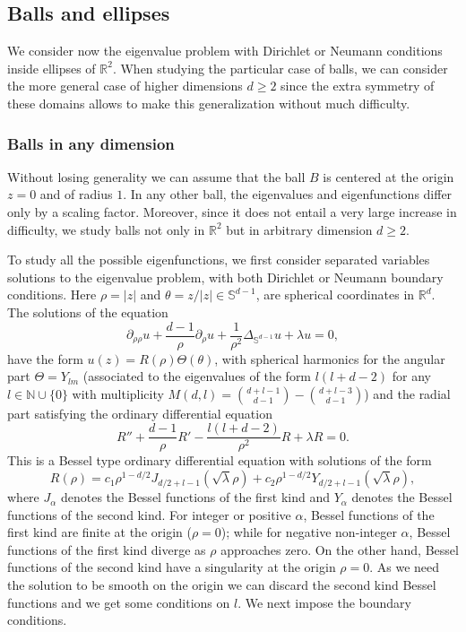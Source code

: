 \documentclass{amsart}
\theoremstyle{definition}
\theoremstyle{remark}
\def\RR{\mathbb{R}}
\renewcommand\geq\geqslant
\numberwithin{equation}{section}
\theoremstyle{definition}
\theoremstyle{remark}
\def\RR{\mathbb{R}}
\begin{document}
\subsection{Balls and ellipses}
We consider now the eigenvalue problem with Dirichlet or Neumann conditions inside ellipses of $\RR^2$. When studying the particular case of balls, we can consider the more general case of higher dimensions $d\geq2$ since the extra symmetry of these domains allows to make this generalization without much difficulty. 

\subsubsection{Balls in any dimension}\label{ball}
Without losing generality we can assume that the ball $B$ is centered at the origin $z=0$ and of radius $1$. In any other ball, the eigenvalues and eigenfunctions differ only by a scaling factor. Moreover, since it does not entail a very large increase in difficulty, we study balls not only in $\RR^2$ but in arbitrary dimension $d\geq2$.

 To study all the possible eigenfunctions, we first consider separated variables solutions to the eigenvalue problem, with both Dirichlet or Neumann boundary conditions. Here $\rho=|z|$ and $\theta=z/|z|\in\mathbb{S}^{d-1}$, are spherical coordinates in $\mathbb{R}^d$. The solutions of the equation \begin{equation*}
	\partial_{\rho\rho}u+\frac{d-1}{\rho}\partial_{\rho}u+\frac{1}{\rho^2}\Delta_{\mathbb{S}^{d-1}}u+\lambda u=0,
\end{equation*}have the form  $u(z)=R(\rho)\Theta(\theta)$,
 with spherical harmonics for the angular part $\Theta=Y_{lm}$ (associated to the eigenvalues of the form $l(l+d-2)$ for any $l\in\mathbb{N}\cup\{0\}$ with multiplicity $M(d,l)= \binom{d+l-1}{d-1}-\binom{d+l-3}{d- 1}$) and the radial part satisfying the ordinary differential equation\begin{equation*}
	R''+\frac{d-1}{\rho}R'-\frac{l(l+d-2)}{\rho^2}R+\lambda R=0. 
\end{equation*}
This is a Bessel type ordinary differential equation with solutions of the form \begin{equation*}
	R(\rho)=c_1\rho^{1-d/2}J_{d/2+l-1}\left(\sqrt{\lambda}\rho\right)+c_2\rho^{1-d/2}Y_{d/2+l-1}\left(\sqrt{\lambda}\rho\right),
\end{equation*}
where $J_\alpha$ denotes the Bessel functions of the first kind and $Y_\alpha$ denotes the Bessel functions of the second kind. 
For integer or positive $\alpha$, Bessel functions of the first kind are finite at the origin ($\rho=0$); while for negative non-integer $\alpha$, Bessel functions of the first kind diverge as $\rho$ approaches zero. On the other hand, Bessel functions of the second kind have a singularity at the origin $\rho=0$. As we need the solution to be smooth on the origin we can discard the second kind Bessel functions and we get some conditions on $l$. We next impose the boundary conditions. 
\end{document}
